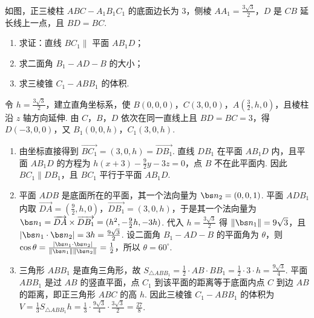 \begin{problem}
如图，正三棱柱 \(ABC-A_1B_1C_1\) 的底面边长为 \(3\)，侧棱 \(AA_1=\frac{3\sqrt{3}}{2}\)，\(D\) 是 \(CB\) 延长线上一点，且 \(BD=BC\).

\begin{enumerate}
\item 求证：直线 \(BC_1\parallel\) 平面 \(AB_1D\)；
\item 求二面角 \(B_1-AD-B\) 的大小；
\item 求三棱锥 \(C_1-ABB_1\) 的体积.
\end{enumerate}

\begin{solution}
令 \(h=\frac{3\sqrt{3}}{2}\)，建立直角坐标系，使 \(B(0,0,0)\)，\(C(3,0,0)\)，\(A(\frac32,h,0)\)，且棱柱沿 \(z\) 轴方向延伸. 由 \(C\)，\(B\)，\(D\) 依次在同一直线上且 \(BD=BC=3\)，得 \(D(-3,0,0)\)，又 \(B_1(0,0,h)\)，\(C_1(3,0,h)\).
\begin{enumerate}
\item 由坐标直接得到 \(\overrightarrow{BC_1}=(3,0,h)=\overrightarrow{DB_1}\). 直线 \(DB_1\) 在平面 \(AB_1D\) 内，且平面 \(AB_1D\) 的方程为 \(h(x+3)-\frac92y-3z=0\)，点 \(B\) 不在此平面内. 因此 \(BC_1\parallel DB_1\)，且 \(BC_1\) 平行于平面 \(AB_1D\).
\item 平面 \(ADB\) 是底面所在的平面，其一个法向量为 \(\bs n_2=(0,0,1)\). 平面 \(ADB_1\) 内取 \(\overrightarrow{DA}=(\frac92,h,0)\)，\(\overrightarrow{DB_1}=(3,0,h)\)，于是其一个法向量为 \(\bs n_1=\overrightarrow{DA}\times\overrightarrow{DB_1}=(h^2,-\frac92h,-3h)\). 代入 \(h=\frac{3\sqrt3}{2}\) 得 \(\lVert\bs n_1\rVert=9\sqrt3\)，且 \(\lvert\bs n_1\cdot\bs n_2\rvert=3h=\frac{9\sqrt3}{2}\). 设二面角 \(B_1-AD-B\) 的平面角为 \(\theta\)，则 \(\cos\theta=\frac{\lvert\bs n_1\cdot\bs n_2\rvert}{\lVert\bs n_1\rVert\lVert\bs n_2\rVert}=\frac12\)，所以 \(\theta=60^{\circ}\).
\item 三角形 \(ABB_1\) 是直角三角形，故 \(S_{\triangle ABB_1}=\frac12\cdot AB\cdot BB_1=\frac12\cdot3\cdot h=\frac{9\sqrt3}{4}\). 平面 \(ABB_1\) 是过 \(AB\) 的竖直平面，点 \(C_1\) 到该平面的距离等于底面内点 \(C\) 到边 \(AB\) 的距离，即正三角形 \(ABC\) 的高 \(h\). 因此三棱锥 \(C_1-ABB_1\) 的体积为 \(V=\frac13S_{\triangle ABB_1}h=\frac13\cdot\frac{9\sqrt3}{4}\cdot\frac{3\sqrt3}{2}=\frac{27}{8}\).
\end{enumerate}
\end{solution}
\end{problem}

